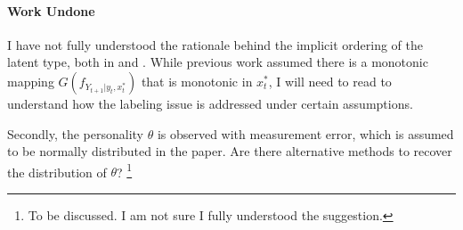 \documentclass[12pt]{article}
\begin{document}
\paragraph{Work Undone} I have not fully understood the rationale behind the implicit ordering of the latent type, both in \citet{hu2012nonparametric} and \citet{hu2017simple}. While previous work assumed there is a monotonic mapping \( G(f_{Y_{t+1}|y_t,x_t^*}) \) that is monotonic in \( x_t^* \), I will need to read \citet{higgins2024learning} to understand how the labeling issue is addressed under certain assumptions.

Secondly, the personality \( \theta \) is observed with measurement error, which is assumed to be normally distributed in the paper. Are there alternative methods to recover the distribution of \( \theta \)? \footnote{To be discussed. I am not sure I fully understood the suggestion.}


\pagebreak \newpage 
\end{document}

